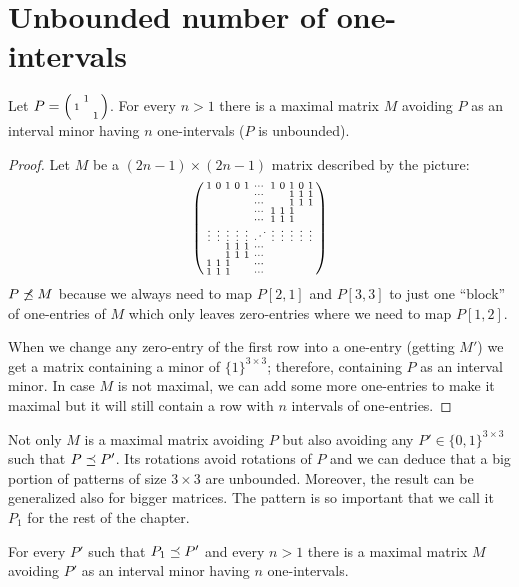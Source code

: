 \section{Unbounded number of one-intervals}
\begin{thm}
\label{manyints}
Let $P=\left(\begin{smallmatrix} &1& \\1& & \\ & &1\end{smallmatrix}\right)$. For every $n>1$ there is a maximal matrix $M$ avoiding $P$ as an interval minor having $n$ one-intervals ($P$ is unbounded).
\end{thm}
\begin{proof} Let $M$ be a $(2n-1)\times(2n-1)$ matrix described by the picture:
$$\left(\begin{smallmatrix}	1&0&1&0&1&\cdots&1&0&1&0&1\\
		 & & & & &\cdots& & &1&1&1\\
		 & & & & &\cdots& & &1&1&1\\
		 & & & & &\cdots&1&1&1& & \\
		 & & & & &\cdots&1&1&1& & \\
		\vdots&\vdots&\vdots&\vdots&\vdots&\iddots&\vdots&\vdots&\vdots&\vdots&\vdots\\
		 & &1&1&1&\cdots& & & & & \\
		 & &1&1&1&\cdots& & & & & \\
		1&1&1& & &\cdots& & & & & \\
		1&1&1& & &\cdots& & & & & \\
		 \end{smallmatrix}\right)$$
$P\not\preceq M$ because we always need to map $P[2,1]$ and $P[3,3]$ to just one ``block'' of one-entries of $M$ which only leaves zero-entries where we need to map $P[1,2]$.

When we change any zero-entry of the first row into a one-entry (getting $M'$) we get a matrix containing a minor of $\{1\}^{3\times3}$; therefore, containing $P$ as an interval minor. In case $M$ is not maximal, we can add some more one-entries to make it maximal but it will still contain a row with $n$ intervals of one-entries.
\end{proof}
Not only $M$ is a maximal matrix avoiding $P$ but also avoiding any $P'\in\{0,1\}^{3\times3}$ such that $P\preceq P'$. Its rotations avoid rotations of $P$ and we can deduce that a big portion of patterns of size $3\times3$ are unbounded. Moreover, the result can be generalized also for bigger matrices. The pattern is so important that we call it $P_1$ for the rest of the chapter.
\begin{thm}
For every $P'$ such that $P_1\preceq P'$ and every $n>1$ there is a maximal matrix $M$ avoiding $P'$ as an interval minor having $n$ one-intervals.
\end{thm}
